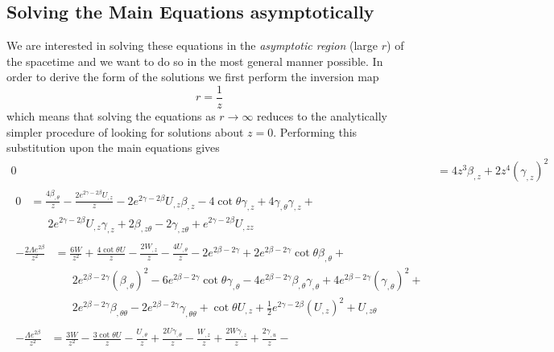 \documentclass[a4paper,11pt]{article}
\numberwithin{equation}{section}
\begin{document}
\subsection{Solving the Main Equations asymptotically}

We are interested in solving these equations in the \textit{asymptotic region} (large $r$) of the spacetime and we want to do so in the most general manner possible. In order to derive the form of the solutions we first perform the inversion map 
\begin{equation}
r=\frac{1}{z}
\end{equation} 
\noindent which means that solving the equations as $r \rightarrow \infty$ reduces to the analytically simpler procedure of looking for solutions about $z=0$. Performing this substitution upon the main equations gives 
\begin{subequations}
\begin{align}
0&=4z^3 \beta_{, z} +2z^4 (\gamma_{,z})^2 \label{eq: irreg_me1} \\ 
\begin{split}
0&= \frac{4 \beta_{, \theta}}{z} - \frac{2 e^{2\gamma - 2\beta} U_{,z}}{z}-2e^{2\gamma-2\beta} U_{,z}\beta_{,z}-4\cot \theta \gamma_{,z}+ 4\gamma_{, \theta}\gamma_{,z}+\\
& \phantom{aaa}2 e^{2\gamma- 2\beta} U_{,z} \gamma_{,z} +2 \beta_{,z\theta}-2\gamma_{, z \theta}+e^{2\gamma-2\beta} U_{, zz} \label{eq: irreg_me2}
\end{split}
\\
\begin{split}
-\frac{2\Lambda e^{2\beta}}{z^2} & = \frac{6W}{z^2}+\frac{4 \cot \theta U}{z} - \frac{2 W_{, z}}{z} - \frac{4 U_{, \theta}}{z} - 2e^{2\beta -2\gamma}+2e^{2\beta-2\gamma}\cot \theta \beta_{, \theta}+\\
& \phantom{aaa} 2e^{2\beta-2\gamma}(\beta_{, \theta})^2-6e^{2\beta-2\gamma}\cot \theta \gamma_{, \theta}-4e^{2\beta-2\gamma}\beta_{, \theta} \gamma_{, \theta}+4e^{2\beta-2\gamma}(\gamma_{,\theta})^2+ \\
& \phantom{aaa} 2e^{2\beta-2\gamma}\beta_{, \theta \theta}-2e^{2\beta-2\gamma}\gamma_{, \theta \theta}+\cot \theta U_{,z}+\frac{1}{2}e^{2\gamma-2\beta}(U_{,z})^2+U_{,z \theta}  \label{eq: irreg_me3}
\end{split}
\\
\begin{split}
-\frac{\Lambda e^{2\beta}}{z^2} & =\frac{3W}{z^2}-\frac{3\cot \theta U}{z}- \frac{U_{,\theta}}{z}+\frac{2U \gamma_{, \theta}}{z}-\frac{W_{,z}}{z}+\frac{2W \gamma_{,z}}{z}+\frac{2\gamma_{,u}}{z}- \\

\end{split}
\end{align}
\end{subequations}
\end{document}
